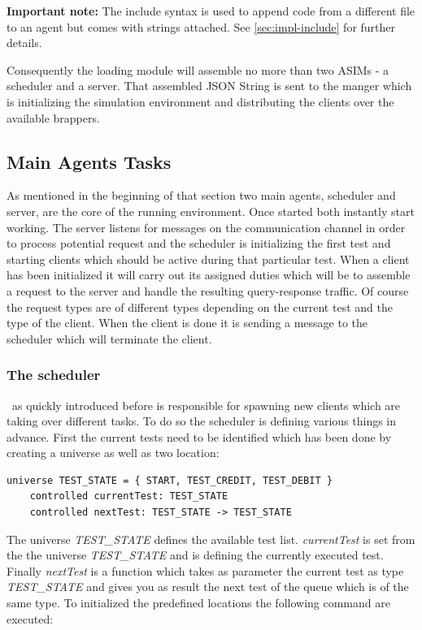 \textbf{Important note:} The include syntax is used to append code from a different file to an agent but comes with strings attached. See \ref{sec:impl-include} for further details.

Consequently the loading module will assemble no more than two ASIMs - a scheduler and a server. That assembled JSON String is sent to the manger which is initializing the simulation environment and distributing the clients over the available brappers.

\subsection{Main Agents Tasks}
\label{subsec:impl-agent-tasks}

As mentioned in the beginning of that section two main agents, scheduler and server, are the core of the running environment. Once started both instantly start working. The server listens for messages on the communication channel in order to process potential request and the scheduler is initializing the first test and starting clients which should be active during that particular test. When a client has been initialized it will carry out its assigned duties which will be to assemble a request to the server and handle the resulting query-response traffic. Of course the request types are of different types depending on the current test and the type of the client. When the client is done it is sending a message to the scheduler which will terminate the client.

\subsubsection{The scheduler}\ as quickly introduced before is responsible for spawning new clients which are taking over different tasks. To do so the scheduler is defining various things in advance. First the current tests need to be identified which has been done by creating a universe as well as two location:

\begin{lstlisting}[language=bsl]
	universe TEST_STATE = { START, TEST_CREDIT, TEST_DEBIT }
	controlled currentTest: TEST_STATE
	controlled nextTest: TEST_STATE -> TEST_STATE
\end{lstlisting}

The universe \textit{TEST\_STATE} defines the available test list. \textit{currentTest} is set from the the universe \textit{TEST\_STATE} and is defining the currently executed test. Finally \textit{nextTest} is a function which takes as parameter the current test as type \textit{TEST\_STATE} and gives you as result the next test of the queue which is of the same type. To initialized the predefined locations the following command are executed:

